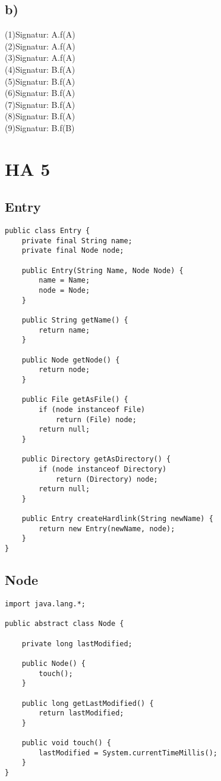 \documentclass[a4paper]{article}
\begin{document}
\subsection*{b)}
(1)Signatur: A.f(A)\\
(2)Signatur: A.f(A)\\
(3)Signatur: A.f(A)\\
(4)Signatur: B.f(A)\\
(5)Signatur: B.f(A)\\
(6)Signatur: B.f(A)\\
(7)Signatur: B.f(A)\\
(8)Signatur: B.f(A)\\
(9)Signatur: B.f(B)\\




\section*{ HA 5 }

\subsection*{Entry}

\begin{lstlisting}
public class Entry {
	private final String name;
	private final Node node;

	public Entry(String Name, Node Node) {
		name = Name;
		node = Node;
	}

	public String getName() {
		return name;
	}

	public Node getNode() {
		return node;
	}

	public File getAsFile() {
		if (node instanceof File)
			return (File) node;
		return null;
	}

	public Directory getAsDirectory() {
		if (node instanceof Directory)
			return (Directory) node;
		return null;
	}

	public Entry createHardlink(String newName) {
		return new Entry(newName, node);
	}
}
\end{lstlisting}

\subsection*{Node}

\begin{lstlisting}
import java.lang.*;

public abstract class Node {

	private long lastModified;

	public Node() {
		touch();
	}

	public long getLastModified() {
		return lastModified;
	}

	public void touch() {
		lastModified = System.currentTimeMillis();
	}
}
\end{lstlisting}
\end{document}
